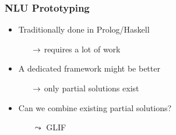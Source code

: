 



\begin{frame}[fragile]
    \frametitle{NLU Prototyping}
    \begin{center}
    \end{center}

    \vspace{1.5em}
    \begin{itemize}
        \item Traditionally done in Prolog/Haskell
        \begin{itemize}
            \item[$\rightarrow$] requires a lot of work
        \end{itemize}
            \item A dedicated framework might be better
        \begin{itemize}
            \item[$\rightarrow$] only partial solutions exist
        \end{itemize}
        \item Can we combine existing partial solutions? %
        \begin{itemize}
            \item[$\leadsto$] GLIF
        \end{itemize}
    \end{itemize}
\end{frame}

